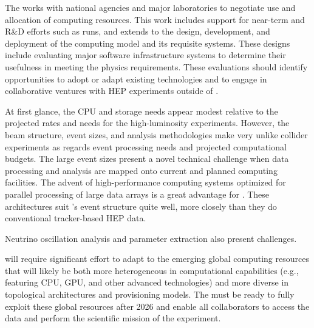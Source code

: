 The  works with national agencies and major laboratories to negotiate use and allocation of computing resources.  This work includes support for near-term and R\&D efforts %
such as  runs, and extends to the design, development, and deployment of the  computing model and its requisite systems. 
These designs include evaluating major software infrastructure systems to determine their usefulness %
in meeting the  physics requirements.   These evaluations should identify opportunities to adopt or adapt existing technologies and to engage in collaborative ventures with HEP experiments outside of . 


At first glance,  the  CPU and storage needs %
appear modest %
relative to the projected rates and needs for the high-luminosity  experiments.  
However, the  beam structure, event sizes, and analysis methodologies make  very unlike collider experiments %
as regards event processing needs and projected computational budgets.  The large  event sizes present a novel technical challenge when data processing and analysis are mapped onto  current and planned computing facilities.  %
The advent of high-performance computing systems optimized for parallel processing of large data arrays is a great advantage for . These architectures suit 's event structure quite well, more closely than they do conventional tracker-based HEP data. 

Neutrino oscillation analysis and parameter extraction also present %
challenges.  

 will require significant effort to adapt to the emerging  %
global computing resources that %
will  likely be both more heterogeneous in computational capabilities (e.g., featuring CPU, GPU, and other advanced technologies) and more diverse in topological architectures and provisioning models.  The   must %
be ready to fully exploit these global resources %
after 2026 and enable all collaborators to access the data and perform the scientific mission of the experiment.  



